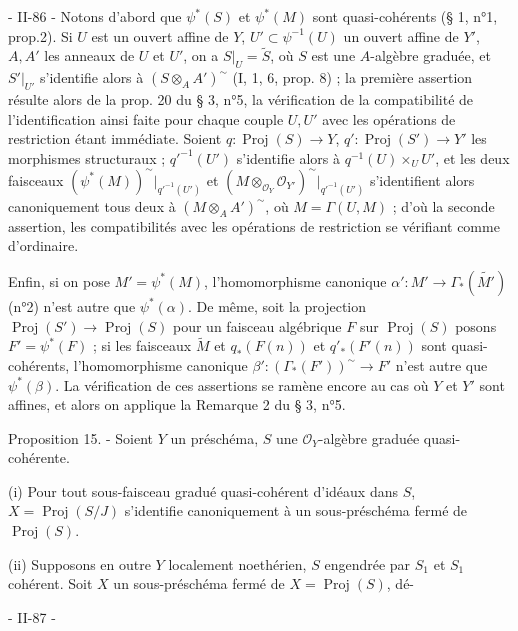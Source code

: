 \newpage


- II-86 -
Notons d'abord que $\psi^*(S)$ et $\psi^*(M)$ sont quasi-cohérents (§ 1, n°1, prop.2). Si $U$ est un ouvert affine de $Y$, $U' \subset \psi^{-1}(U)$ un ouvert affine de $Y'$, $A, A'$ les anneaux de $U$ et $U'$, on a $S|_U = \tilde{S}$, où $S$ est une $A$-algèbre graduée, et $S'|_{U'}$ s'identifie alors à $(S \otimes_A A')^{\sim}$ (I, 1, 6, prop. 8) ; la première assertion résulte alors de la prop. 20 du § 3, n°5, la vérification de la compatibilité de l'identification ainsi faite pour chaque couple $U, U'$ avec les opérations de restriction étant immédiate. Soient $q : \operatorname{Proj}(S) \to Y$, $q' : \operatorname{Proj}(S') \to Y'$ les morphismes structuraux ; $q'^{-1}(U')$ s'identifie alors à $q^{-1}(U) \times_U U'$, et les deux faisceaux $(\psi^*(M))^{\sim}|_{q'^{-1}(U')}$ et $(M \otimes_{\mathcal{O}_Y} \mathcal{O}_{Y'})^{\sim}|_{q'^{-1}(U')}$ s'identifient alors canoniquement tous deux à $(M \otimes_A A')^{\sim}$, où $M = \Gamma(U, M)$ ; d'où la seconde assertion, les compatibilités avec les opérations de restriction se vérifiant comme d'ordinaire.

Enfin, si on pose $M' = \psi^*(M)$, l'homomorphisme canonique $\alpha' : M' \to \Gamma_*(\tilde{M'})$ (n°2) n'est autre que $\psi^*(\alpha)$. De même, soit la projection $\operatorname{Proj}(S') \to \operatorname{Proj}(S)$ pour un faisceau algébrique $F$ sur $\operatorname{Proj}(S)$ posons $F' = \psi^*(F)$ ; si les faisceaux $\tilde{M}$ et $q_*(F(n))$ et $q'_*(F'(n))$ sont quasi-cohérents, l'homomorphisme canonique $\beta' : (\Gamma_* (F'))^{\sim} \to F'$ n'est autre que $\psi^*(\beta)$. La vérification de ces assertions se ramène encore au cas où $Y$ et $Y'$ sont affines, et alors on applique la Remarque 2 du § 3, n°5.

Proposition 15. - Soient $Y$ un préschéma, $S$ une $\mathcal{O}_Y$-algèbre graduée quasi-cohérente.

(i) Pour tout sous-faisceau gradué quasi-cohérent d'idéaux dans $S$, $X = \operatorname{Proj}(S/J)$ s'identifie canoniquement à un sous-préschéma fermé de $\operatorname{Proj}(S)$.

(ii) Supposons en outre $Y$ localement noethérien, $S$ engendrée par $S_1$ et $S_1$ cohérent. Soit $X$ un sous-préschéma fermé de $X = \operatorname{Proj}(S)$, dé-

\newpage


- II-87 -

